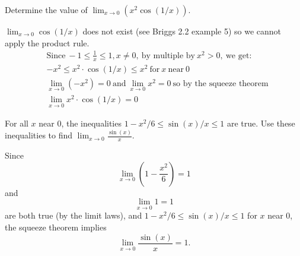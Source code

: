 \documentclass[nooutcomes]{ximera}
\begin{document}
\begin{problem}


  Determine the value of $\lim_{x \to 0} (x^2 \cos(1/x))$.
  \begin{freeResponse}
	$\lim_{x \to 0} \cos(1/x)$ does not exist (see Briggs 2.2 example 5) so we cannot apply the product rule.
	\begin{align*}    
		&\text{Since}\ -1\le \frac{1}{x} \le 1, x\ne 0,\ \text{by multiple by}\ x^2>0,\ \text{we get:}\\
		&-x^2 \le x^2 \cdot \cos(1/x) \le x^2\ \text{for}\ x\ \text{near}\ 0\\
		 &\lim_{x \to 0} (-x^2) = 0\ \text{and}\ \lim_{x \to 0} x^2 = 0\ \text{so by the squeeze theorem}\\
    		&\lim_{x \to 0} x^2 \cdot \cos(1/x) = 0
	\end{align*}
  \end{freeResponse}

\end{problem}
	
	
	
	
	
	
\begin{problem}
 For all $x$ near 0, the inequalities $1 - x^2/6 \le \sin(x)/x \le 1$ are true.
  Use these inequalities to find $\displaystyle\lim_{x \to 0} \frac{\sin(x)}{x}$.
  \begin{freeResponse}
    Since
    \[
      \lim_{x \to 0} \left(1 - \frac{x^2}{6}\right) = 1
    \]
    and
    \[
     \lim_{x \to 0} 1 = 1
    \]
    are both true (by the limit laws), and $1 - x^2/6 \le \sin(x)/x \le 1$ for $x$ near 0, the squeeze theorem implies
    \[
     \lim_{x \to 0} \frac{\sin(x)}{x} = 1.
    \]


  \end{freeResponse}



\end{problem}
	
\end{document}
